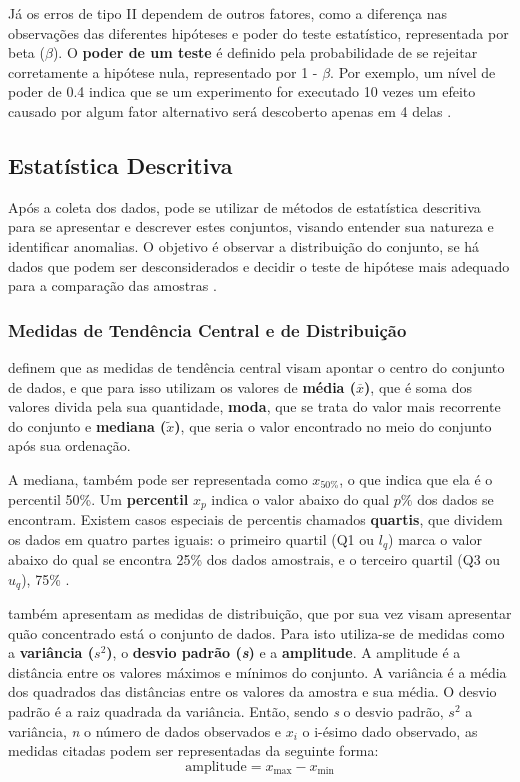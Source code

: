 Já os erros de tipo II dependem de outros fatores, como a diferença nas observações das diferentes hipóteses e poder do teste estatístico, representada por beta (\( \beta \)). O \textbf{poder de um teste} é definido pela probabilidade de se rejeitar corretamente a hipótese nula, representado por 1 - \( \beta \). Por exemplo, um nível de poder de 0.4 indica que se um experimento for executado 10 vezes um efeito causado por algum fator alternativo será descoberto apenas em 4 delas \cite{juristo_basics_2001}.

\subsection{Estatística Descritiva}
\label{subsec:descritiva}

Após a coleta dos dados, pode se utilizar de métodos de estatística descritiva para se apresentar e descrever estes conjuntos, visando entender sua natureza e identificar anomalias. O objetivo é observar a distribuição do conjunto, se há dados que podem ser desconsiderados e decidir o teste de hipótese mais adequado para a comparação das amostras \cite{wohlin_experimentation_2012}.

\subsubsection{Medidas de Tendência Central e de Distribuição}

 definem que as medidas de tendência central visam apontar o centro do conjunto de dados, e que para isso utilizam os valores de \textbf{média (\( \overline{x} \))}, que é soma dos valores divida pela sua quantidade, \textbf{moda}, que se trata do valor mais recorrente do conjunto e \textbf{mediana (\( \tilde{x} \))}, que seria o valor encontrado no meio do conjunto após sua ordenação.

A mediana, também pode ser representada como \(x_{50\%}\), o que indica que ela é o percentil 50\%. Um \textbf{percentil} \(x_p\) indica o valor abaixo do qual \(p\%\) dos dados se encontram. Existem casos especiais de percentis chamados \textbf{quartis}, que dividem os dados em quatro partes iguais: o primeiro quartil (Q1 ou \(l_q\)) marca o valor abaixo do qual se encontra 25\% dos dados amostrais, e o terceiro quartil (Q3 ou \(u_q\)), 75\% \cite{wohlin_experimentation_2012}.

 também apresentam as medidas de distribuição, que por sua vez visam apresentar quão concentrado está o conjunto de dados. Para isto utiliza-se de medidas como a \textbf{variância (\textit{\( s^2 \)})}, o \textbf{desvio padrão (\textit{s})} e a \textbf{amplitude}. A amplitude é a distância entre os valores máximos e mínimos do conjunto. A variância é a média dos quadrados das distâncias entre os valores da amostra e sua média. O desvio padrão é a raiz quadrada da variância. Então, sendo \textit{s} o desvio padrão, \( s^2 \) a variância, \textit{n} o número de dados observados e \(x_i \) o i-ésimo dado observado, as medidas citadas podem ser representadas da seguinte forma:
\[
\text{amplitude} = x_{\text{max}} - x_{\text{min}}
\]


